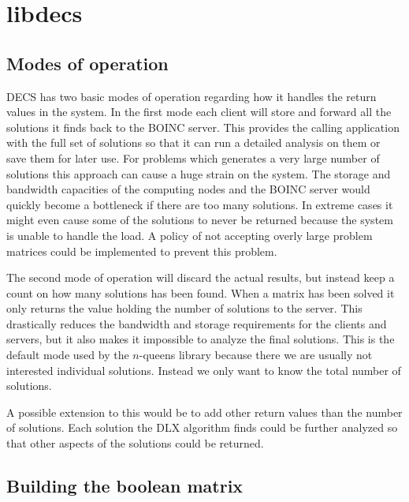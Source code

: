 \section{libdecs}


\subsection{Modes of operation}

DECS has two basic modes of operation regarding how it handles the return values in the system.
In the first mode each client will store and forward all the solutions it finds back to the BOINC server.
This provides the calling application with the full set of solutions so that it can run a detailed analysis on them or save them for later use.
For problems which generates a very large number of solutions this approach can cause a huge strain on the system.
The storage and bandwidth capacities of the computing nodes and the BOINC server would quickly become a bottleneck if there are too many solutions.
In extreme cases it might even cause some of the solutions to never be returned because the system is unable to handle the load.
A policy of not accepting overly large problem matrices could be implemented to prevent this problem.

The second mode of operation will discard the actual results, but instead keep a count on how many solutions has been found.
When a matrix has been solved it only returns the value holding the number of solutions to the server.
This drastically reduces the bandwidth and storage requirements for the clients and servers, but it also makes it impossible to analyze the final solutions.
This is the default mode used by the $n$-queens library because there we are usually not interested individual solutions.
Instead we only want to know the total number of solutions.

A possible extension to this would be to add other return values than the number of solutions.
Each solution the DLX algorithm finds could be further analyzed so that other aspects of the solutions could be returned.



\subsection{Building the boolean matrix}
\label{matrix_construction}

